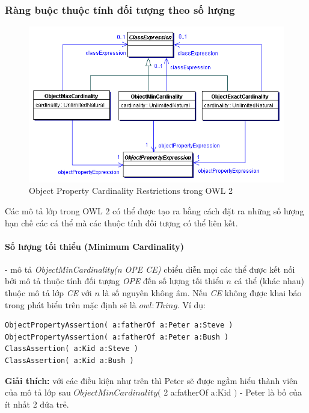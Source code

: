 \subsubsection{Ràng buộc thuộc tính đối tượng theo số lượng}
\begin{figure}[h]
	\centering
	\includegraphics[width=150mm]{Figures/ce_2.png}
	\caption{Object Property Cardinality Restrictions trong OWL 2\label{overflow}}
\end{figure}
Các mô tả lớp trong OWL 2 có thể được tạo ra bằng cách đặt ra những số lượng hạn chế các cá thể mà các thuộc tính đối tượng có thể liên kết.
\paragraph{Số lượng tối thiểu (Minimum Cardinality)} - mô tả \textit{ObjectMinCardinality(n OPE  CE)} cbiểu diễn mọi các thể được kết nối bởi mô tả thuộc tính đối tượng \textit{OPE} đến số lượng tối thiểu $n$ cá thể (khác nhau) thuộc mô tả lớp \textit{CE} với $n$ là số nguyên không âm. Nếu \textit{CE} không được khai báo trong phát biểu trên mặc định sẽ là $owl:Thing$. Ví dụ:
\begin{verbatim}
ObjectPropertyAssertion( a:fatherOf a:Peter a:Steve )
ObjectPropertyAssertion( a:fatherOf a:Peter a:Bush )
ClassAssertion( a:Kid a:Steve )
ClassAssertion( a:Kid a:Bush )
\end{verbatim}
\textbf{Giải thích:} với các điều kiện như trên thì Peter sẽ được ngầm hiểu thành viên của mô tả lớp sau 
$ObjectMinCardinality($ 2 a:fatherOf a:Kid $)$ - Peter là bố của ít nhất 2 đứa trẻ.

